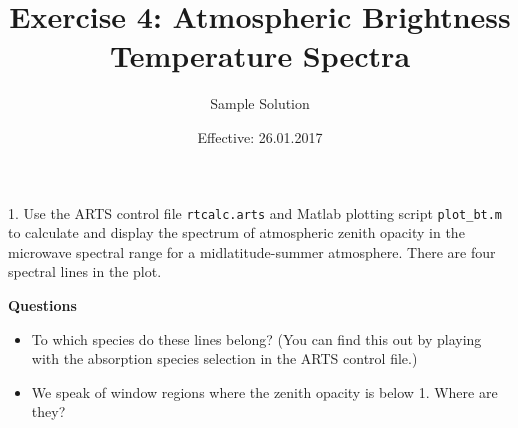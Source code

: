 \documentclass[paper=a4, fontsize=11pt]{scrartcl} %
\title{Exercise 4: Atmospheric Brightness Temperature Spectra}
\author{Sample Solution}
\date{Effective: 26.01.2017}
\begin{document}
\maketitle

1. Use the ARTS control file \texttt{rtcalc.arts} and Matlab plotting script
\texttt{plot\_bt.m} to calculate and display the spectrum of atmospheric zenith
opacity in the microwave spectral range for a midlatitude-summer atmosphere.
There are four spectral lines in the plot. 

\textbf{Questions}
\begin{itemize}
  \item To which species do these lines belong? (You can find this out by
      playing with the absorption species selection in the ARTS control file.)
  \item We speak of window regions where the zenith opacity is below 1. Where
      are they?
\end{itemize}
\end{document}
